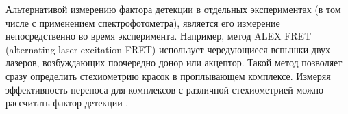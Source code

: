 Альтернативой измерению фактора детекции в отдельных экспериментах (в том числе с применением спектрофотометра), является его измерение непосредственно во время эксперимента. Например, метод ALEX FRET (alternating laser excitation FRET) использует чередующиеся вспышки двух лазеров, возбуждающих поочередно донор или акцептор. Такой метод позволяет сразу определить стехиометрию красок в проплывающем комплексе. Измеряя эффективность переноса для комплексов с различной стехиометрией можно рассчитать фактор детекции \cite{lee_accurate_2005}. 

